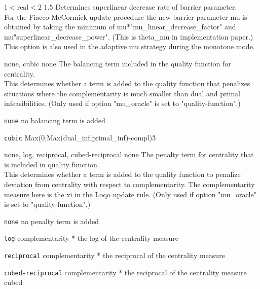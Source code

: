 %
{$1<\textrm{real}<2$}%
{$1.5$}%
{Determines superlinear decrease rate of barrier parameter.\\
For the Fiacco-McCormick update procedure the new barrier parameter mu is obtained by taking the minimum of mu*"mu\_linear\_decrease\_factor" and mu\^"superlinear\_decrease\_power".  (This is theta\_mu in implementation paper.) This option is also used in the adaptive mu strategy during the monotone mode.}%
{}

%
{none, cubic}%
{none}%
{The balancing term included in the quality function for centrality.\\
This determines whether a term is added to the quality function that penalizes situations where the complementarity is much smaller than dual and primal infeasibilities. (Only used if option "mu\_oracle" is set to "quality-function".)}%
{\begin{list}{}{
\setlength{\parsep}{0em}
\setlength{\leftmargin}{5ex}
\setlength{\labelwidth}{2ex}
\setlength{\itemindent}{0ex}
\setlength{\topsep}{0pt}}
\item[\texttt{none}] no balancing term is added
\item[\texttt{cubic}] Max(0,Max(dual\_inf,primal\_inf)-compl)\^3
\end{list}
}

%
{none, log, reciprocal, cubed-reciprocal}%
{none}%
{The penalty term for centrality that is included in quality function.\\
This determines whether a term is added to the quality function to penalize deviation from centrality with respect to complementarity.  The complementarity measure here is the xi in the Loqo update rule. (Only used if option "mu\_oracle" is set to "quality-function".)}%
{\begin{list}{}{
\setlength{\parsep}{0em}
\setlength{\leftmargin}{5ex}
\setlength{\labelwidth}{2ex}
\setlength{\itemindent}{0ex}
\setlength{\topsep}{0pt}}
\item[\texttt{none}] no penalty term is added
\item[\texttt{log}] complementarity * the log of the centrality measure
\item[\texttt{reciprocal}] complementarity * the reciprocal of the centrality measure
\item[\texttt{cubed-reciprocal}] complementarity * the reciprocal of the centrality measure cubed
\end{list}
}


